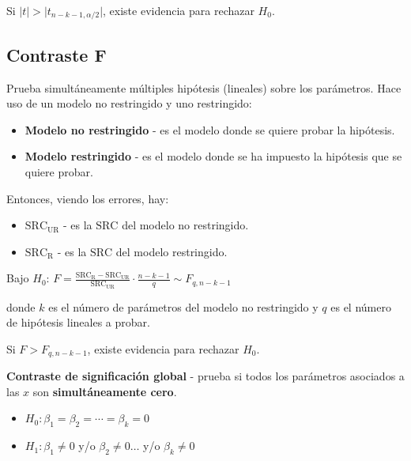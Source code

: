 \documentclass[10pt, a4paper, landscape]{article}
\newcommand{\SSR}{\text{SRC}}
\begin{document}
\begin{multicols}{3}
Si \( \lvert t \rvert > \lvert t_{n - k - 1, \alpha / 2} \rvert \), existe evidencia para rechazar \( H_{0} \).

\subsection*{Contraste F}

Prueba simultáneamente múltiples hipótesis (lineales) sobre los parámetros. Hace uso de un modelo no restringido y uno restringido:

\begin{itemize}[leftmargin=*]
	\item \textbf{Modelo no restringido} - es el modelo donde se quiere probar la hipótesis.
	\item \textbf{Modelo restringido} - es el modelo donde se ha impuesto la hipótesis que se quiere probar.
\end{itemize}

Entonces, viendo los errores, hay:

\begin{itemize}[leftmargin=*]
	\item \textbf{\( \SSR_{\text{UR}} \)} - es la \( \SSR \) del modelo no restringido.
	\item \textbf{\( \SSR_{\text{R}} \)} - es la \( \SSR \) del modelo restringido.
\end{itemize}

\begin{center}
	Bajo \( H_{0} \): \quad \( F = \frac{\SSR_{\text{R}} - \SSR_{\text{UR}}}{\SSR_{\text{UR}}} \cdot \frac{n - k - 1}{q} \sim F_{q, n - k - 1} \)
\end{center}

donde \( k \) es el número de parámetros del modelo no restringido y \( q \) es el número de hipótesis lineales a probar.

Si \( F > F_{q, n - k - 1} \), existe evidencia para rechazar \( H_{0} \).

\textbf{Contraste de significación global} - prueba si todos los parámetros asociados a las \( x \) son \textbf{simultáneamente cero}.

\begin{itemize}[leftmargin=*]
	\item \( H_{0}: \beta_{1} = \beta_{2} = \cdots = \beta_{k} = 0 \)
	\item \( H_{1}: \beta_{1} \neq 0 \) y/o \( \beta_{2} \neq 0 \ldots \) y/o \( \beta_{k} \neq 0 \)
\end{itemize}


\end{multicols}
\end{document}
